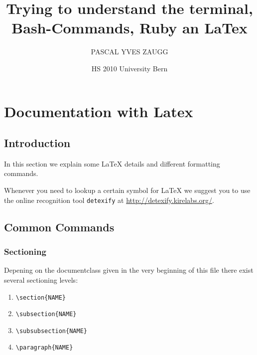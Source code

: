\documentclass[10pt,a4paper]{scrartcl}
\date{HS 2010 University Bern}
\author{PASCAL YVES ZAUGG}
\title{Trying to understand the terminal, Bash-Commands, Ruby an LaTex}
\begin{document}
\maketitle

\tableofcontents

\newpage
\section{Documentation with Latex}
\subsection{Introduction} 

In this section we explain some \LaTeX\xspace details and different formatting
commands.

Whenever you need to lookup a certain symbol for \LaTeX\xspace we suggest you
to use the online recognition tool \texttt{detexify} at
\url{http://detexify.kirelabs.org/}.


\subsection{Common Commands}
\subsubsection{Sectioning}
Depening on the documentclass given in the very beginning of this file there
exist several sectioning levels:
\begin{enumerate}
\item{} \verb$\section{NAME}$
\item{} \verb$\subsection{NAME}$
\item{} \verb$\subsubsection{NAME}$
\item{} \verb$\paragraph{NAME}$
\end{enumerate}
\end{document}
